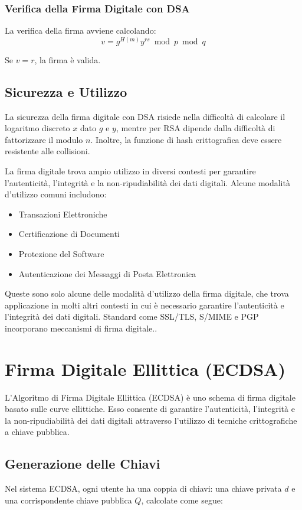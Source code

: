 \documentclass[a4paper,12pt]{report}
\begin{document}
\subsection*{Verifica della Firma Digitale con DSA}
La verifica della firma avviene calcolando:
\[v = g^{H(m)}y^{rs} \bmod p \bmod q\]

Se $v = r$, la firma è valida.

\section{Sicurezza e Utilizzo}
La sicurezza della firma digitale con DSA risiede nella difficoltà di calcolare il logaritmo discreto $x$ dato $g$ e $y$, mentre per RSA dipende dalla difficoltà di fattorizzare il modulo $n$. Inoltre, la funzione di hash crittografica deve essere resistente alle collisioni.

La firma digitale trova ampio utilizzo in diversi contesti per garantire l'autenticità, l'integrità e la non-ripudiabilità dei dati digitali. Alcune modalità d'utilizzo comuni includono:

\begin{itemize}
    \item Transazioni Elettroniche
    \item Certificazione di Documenti
    \item Protezione del Software
    \item Autenticazione dei Messaggi di Posta Elettronica
\end{itemize}

Queste sono solo alcune delle modalità d'utilizzo della firma digitale, che trova applicazione in molti altri contesti in cui è necessario garantire l'autenticità e l'integrità dei dati digitali. Standard come SSL/TLS, S/MIME e PGP incorporano meccanismi di firma digitale..
%
%
%
%
%
%
%
%
%
%
%
%

\chapter{Firma Digitale Ellittica (ECDSA)}
L'Algoritmo di Firma Digitale Ellittica (ECDSA) è uno schema di firma digitale basato sulle curve ellittiche. Esso consente di garantire l'autenticità, l'integrità e la non-ripudiabilità dei dati digitali attraverso l'utilizzo di tecniche crittografiche a chiave pubblica.

\section{Generazione delle Chiavi}
Nel sistema ECDSA, ogni utente ha una coppia di chiavi: una chiave privata $d$ e una corrispondente chiave pubblica $Q$, calcolate come segue:
\end{document}
